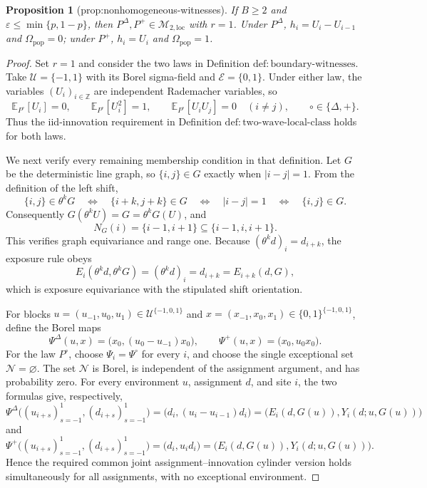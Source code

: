 \documentclass{article}
\newtheorem{proposition}{Proposition}
\begin{document}
\begin{proposition}[prop:nonhomogeneous-witnesses]\label{prop:nonhomogeneous-witnesses}
If \(B\ge2\) and \(\varepsilon\le\min\{p,1-p\}\), then \(P^{\Delta},P^{+}\in\mathcal M_{2,\mathrm{loc}}\) with \(r=1\). Under \(P^{\Delta}\), \(h_i=U_i-U_{i-1}\) and \(\Omega_{\mathrm{pop}}=0\); under \(P^{+}\), \(h_i=U_i\) and \(\Omega_{\mathrm{pop}}=1\).
\end{proposition}
\begin{proof}
Set \(r=1\) and consider the two laws in Definition \(\mathrm{def{:}boundary\text{-}witnesses}\).  Take \(\mathcal U=\{-1,1\}\) with its Borel sigma-field and \(\mathcal E=\{0,1\}\).  Under either law, the variables \((U_i)_{i\in\mathbb Z}\) are independent Rademacher variables, so
\[
 \mathbb E_{P^{\circ}}[U_i]=0,
 \qquad
 \mathbb E_{P^{\circ}}[U_i^2]=1,
 \qquad
 \mathbb E_{P^{\circ}}[U_iU_j]=0\quad(i\ne j),
 \qquad \circ\in\{\Delta,+\}.
\]
Thus the iid-innovation requirement in Definition \(\mathrm{def{:}two\text{-}wave\text{-}local\text{-}class}\) holds for both laws.

We next verify every remaining membership condition in that definition.  Let \(G\) be the deterministic line graph, so \(\{i,j\}\in G\) exactly when \(|i-j|=1\).  From the definition of the left shift,
\[
 \{i,j\}\in\theta^kG
 \quad\Longleftrightarrow\quad
 \{i+k,j+k\}\in G
 \quad\Longleftrightarrow\quad
 |i-j|=1
 \quad\Longleftrightarrow\quad
 \{i,j\}\in G.
\]
Consequently \(G(\theta^kU)=G=\theta^kG(U)\), and
\[
 N_G(i)=\{i-1,i+1\}\subseteq\{i-1,i,i+1\}.
\]
This verifies graph equivariance and range one.  Because \((\theta^kd)_i=d_{i+k}\), the exposure rule obeys
\[
 E_i(\theta^kd,\theta^kG)=(\theta^kd)_i=d_{i+k}=E_{i+k}(d,G),
\]
which is exposure equivariance with the stipulated shift orientation.

For blocks \(u=(u_{-1},u_0,u_1)\in\mathcal U^{\{-1,0,1\}}\) and \(x=(x_{-1},x_0,x_1)\in\{0,1\}^{\{-1,0,1\}}\), define the Borel maps
\[
 \Psi^{\Delta}(u,x)=\bigl(x_0,(u_0-u_{-1})x_0\bigr),
 \qquad
 \Psi^{+}(u,x)=\bigl(x_0,u_0x_0\bigr).
\]
For the law \(P^{\circ}\), choose \(\Psi_i=\Psi^{\circ}\) for every \(i\), and choose the single exceptional set \(\mathcal N=\varnothing\).  The set \(\mathcal N\) is Borel, is independent of the assignment argument, and has probability zero.  For every environment \(u\), assignment \(d\), and site \(i\), the two formulas give, respectively,
\[
 \Psi^{\Delta}\bigl((u_{i+s})_{s=-1}^{1},(d_{i+s})_{s=-1}^{1}\bigr)
 =\bigl(d_i,(u_i-u_{i-1})d_i\bigr)
 =\bigl(E_i(d,G(u)),Y_i(d;u,G(u))\bigr)
\]
and
\[
 \Psi^{+}\bigl((u_{i+s})_{s=-1}^{1},(d_{i+s})_{s=-1}^{1}\bigr)
 =\bigl(d_i,u_id_i\bigr)
 =\bigl(E_i(d,G(u)),Y_i(d;u,G(u))\bigr).
\]
Hence the required common joint assignment--innovation cylinder version holds simultaneously for all assignments, with no exceptional environment.


\end{proof}
\end{document}
